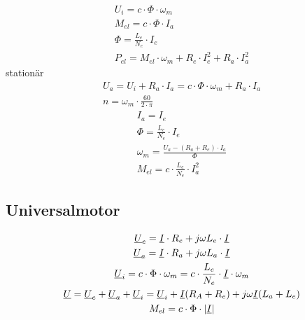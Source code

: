 \columnbreak
{\setlength{\jot}{3pt}
\begin{gather*}
U_i = c \cdot \Phi \cdot \omega_m \\
M_{el} = c \cdot \Phi \cdot I_a \\
\Phi = \frac{L_e}{N_e} \cdot I_e \\
P_{el} = M_{el} \cdot \omega_m + R_e \cdot I_e^2 + R_a \cdot I_a^2
\end{gather*}
stationär
\begin{gather*}
U_a = U_i + R_a \cdot I_a = c \cdot \Phi \cdot \omega_m + R_a \cdot I_a \\
n = \omega_m \cdot \frac{60}{2 \cdot \pi}
\end{gather*}}
{\setlength{\jot}{3pt}
\begin{gather*}
I_a = I_e \\
\Phi = \frac{L_e}{N_e} \cdot I_e \\
\omega_m = \frac{U_a - (R_a + R_e) \cdot I_a}{\Phi} \\
M_{el} = c \cdot \frac{L_e}{N_e} \cdot I_a^2
\end{gather*}}

\subsection{Universalmotor}
{\setlength{\jot}{3pt}
\begin{gather*}
\underline{U}_e = \underline{I} \cdot R_e + j\omega L_e \cdot \underline{I} \\
\underline{U}_a = \underline{I} \cdot R_a + j\omega L_a \cdot \underline{I} \\
\underline{U}_i = c \cdot \Phi \cdot \omega_m = c \cdot \frac{L_e}{N_e} \cdot \underline{I} \cdot \omega_m \\
\underline{U} = \underline{U}_e + \underline{U}_a + \underline{U}_i = \underline{U}_i + \underline{I}(R_A + R_e) + j\omega\underline{I}(L_a + L_e) \\
M_{el} = c \cdot \Phi \cdot |\underline{I}|
\end{gather*}}

\columnbreak
